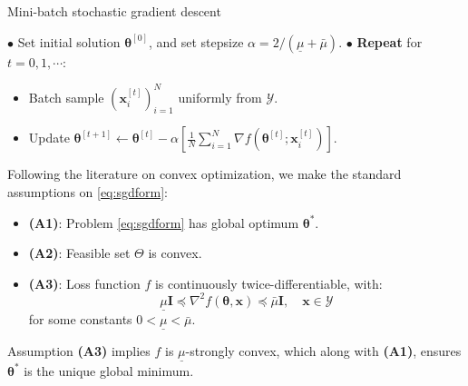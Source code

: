 \documentclass[12pt]{article}
\newcommand{\bm}[1]{\mathbf{#1}}
\newcommand{\bi}{\begin{itemize}}
\newcommand{\ei}{\end{itemize}}
\begin{document}
\begin{algorithm}[t]
\caption{Mini-batch stochastic gradient descent}
\label{alg:mbsgd}
\begin{algorithmic}
\STATE $\bullet$ Set initial solution $\boldsymbol{\theta}^{[0]}$, and set stepsize $\alpha = 2 / (\underline{\mu}+\bar{\mu})$.
\STATE $\bullet$ \textbf{Repeat} for $t = 0, 1, \cdots$:
\bi
\item Batch sample $(\bm{x}_i^{[t]})_{i=1}^N$ uniformly from $\mathcal{Y}$.
\item Update $\boldsymbol{\theta}^{[t+1]} \leftarrow \boldsymbol{\theta}^{[t]} - \alpha \left[ \frac{1}{N} \sum_{i=1}^N \nabla f(\boldsymbol{\theta}^{[t]}; \bm{x}_i^{[t]}) \right]$.
\ei
\end{algorithmic}
\end{algorithm}

Following the literature on convex optimization, we make the standard assumptions on \eqref{eq:sgdform}:
\bi
\item \textbf{(A1)}: Problem \eqref{eq:sgdform} has global optimum $\boldsymbol{\theta}^*$.
\item \textbf{(A2)}: Feasible set $\Theta$ is convex.
\item \textbf{(A3)}: Loss function $f$ is continuously twice-differentiable, with:
\begin{equation}
\underline{\mu} \bm{I} \preceq \nabla^2 f(\boldsymbol{\theta},\bm{x}) \preceq \bar{\mu} \bm{I}, \quad \bm{x} \in \mathcal{Y}
\label{eq:muconv}
\end{equation}
for some constants $0 < \underline{\mu} < \bar{\mu}$.
\ei
Assumption \textbf{(A3)} implies $f$ is $\underline{\mu}$-strongly convex, which along with \textbf{(A1)}, ensures $\boldsymbol{\theta}^*$ is the unique global minimum.\\
\end{document}
